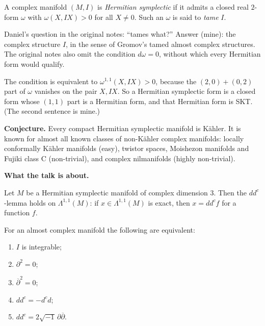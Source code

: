 \begin{definition}
\label{definition-verbitsky-herm-sympl}
A complex manifold $(M,I)$ is
\emph{Hermitian symplectic} if it admits a
closed real $2$-form $\omega$ with
$\omega(X,IX)>0$ for all $X\neq 0$. Such an
$\omega$ is said to \emph{tame} $I$.
\end{definition}

Daniel's question in the original notes:
``tames what?'' Answer (mine): the complex
structure $I$, in the sense of Gromov's
tamed almost complex structures. The
original notes also omit the condition
$d\omega=0$, without which every Hermitian
form would qualify.

\begin{remark}
\label{remark-verbitsky-11-part}
The condition is equivalent to
$\omega^{1,1}(X,IX)>0$, because the
$(2,0)+(0,2)$ part of $\omega$ vanishes on
the pair $X,IX$. So a Hermitian symplectic
form is a closed form whose $(1,1)$ part is
a Hermitian form, and that Hermitian form is
SKT. (The second sentence is mine.)
\end{remark}

\medskip\noindent
{\bf Conjecture.} Every compact Hermitian
symplectic manifold is Kähler. It is known
for almost all known classes of
non-Kähler complex manifolds: locally
conformally Kähler manifolds (easy), twistor
spaces, Moishezon manifolds and Fujiki
class C (non-trivial), and complex
nilmanifolds (highly non-trivial).

\medskip\noindent
{\bf What the talk is about.}

\begin{theorem}
\label{theorem-verbitsky-ddc-lemma}
Let $M$ be a Hermitian symplectic manifold
of complex dimension $3$. Then the
$dd^c$-lemma holds on $\Lambda^{1,1}(M)$: if
$x\in\Lambda^{1,1}(M)$ is exact, then
$x=dd^cf$ for a function $f$.
\end{theorem}

\begin{theorem}
\label{theorem-verbitsky-integrability}
For an almost complex manifold the
following are equivalent:
\begin{enumerate}
\item $I$ is integrable;
\item $\partial^2=0$;
\item $\overline{\partial}^2=0$;
\item $dd^c=-d^cd$;
\item $dd^c=2\sqrt{-1}\,\partial
\overline{\partial}$.
\end{enumerate}
\end{theorem}

